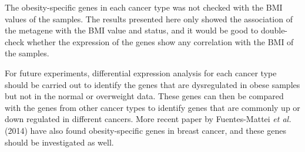 \documentclass[12pt, a4paper]{article}
\begin{document}
The obesity-specific genes in each cancer type was not checked with the BMI values of the samples.
The results presented here only showed the association of the metagene with the BMI value and status, and it would be good to double-check whether the expression of the genes show any correlation with the BMI of the samples.

For future experiments, differential expression analysis for each cancer type should be carried out to identify the genes that are dysregulated in obese samples but not in the normal or overweight data.
These genes can then be compared with the genes from other cancer types to identify genes that are  commonly up or down regulated in different cancers.
More recent paper by Fuentes-Mattei \textit{et al.} (2014) have also found obesity-specific genes in breast cancer, and these genes should be investigated as well.


%
%
\end{document}
